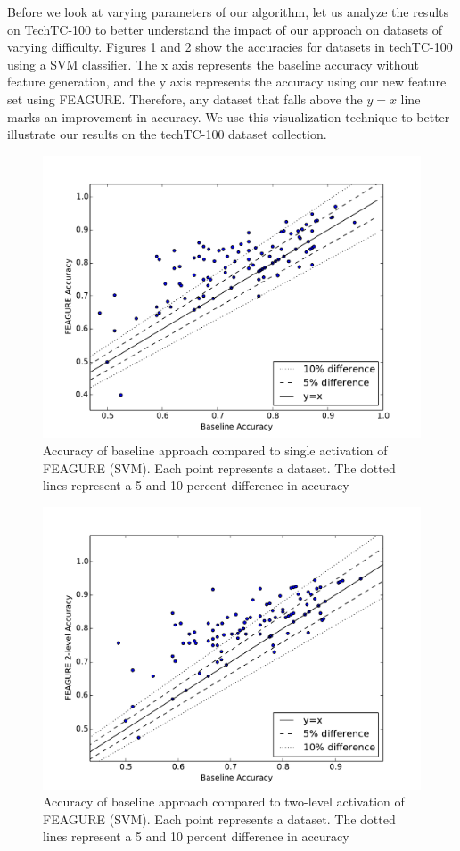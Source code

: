 \documentclass[twoside,11pt]{article}
\theoremstyle{definition}
\begin{document}
Before we look at varying parameters of our algorithm, let us analyze the results on TechTC-100 to better understand the impact of our approach on datasets of varying difficulty. Figures \ref{fig:svm_base_lvl1} and \ref{fig:svm_base_lvl2} show the accuracies for datasets in techTC-100 using a SVM classifier. The x axis represents the baseline accuracy without feature generation, and the y axis represents the accuracy using our new feature set using FEAGURE. Therefore, any dataset that falls above the $y=x$ line marks an improvement in accuracy. We use this visualization technique to better illustrate our results on the techTC-100 dataset collection.

\begin{figure}
	\centering
	\includegraphics[width=0.8\linewidth]{svm_full}
	\caption{Accuracy of
		baseline approach compared to single activation of FEAGURE (SVM). Each point represents a dataset. The dotted lines represent a 5 and 10 percent difference in accuracy}
	\label{fig:svm_base_lvl1}
\end{figure}

\begin{figure}
	\centering
	\includegraphics[width=0.8\linewidth]{svm_full_lvl2}
	\caption{Accuracy of
		baseline approach compared to two-level activation of FEAGURE (SVM). Each point represents a dataset. The dotted lines represent a 5 and 10 percent difference in accuracy}
	\label{fig:svm_base_lvl2}
\end{figure}
\end{document}
